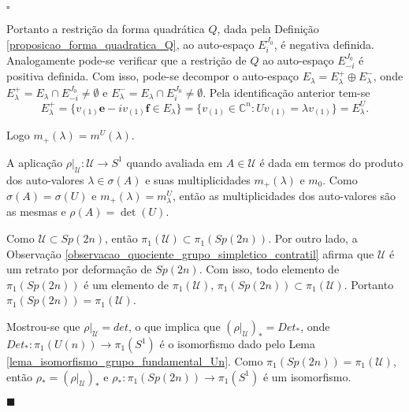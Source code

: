 \documentclass[12pt]{book}
\newenvironment{prova}[1]{$\square$ #1}{\hfill$\blacksquare$}
\newcommand{\autoespaco}[1]{E_{#1}}
\newcommand{\circulo}{S^{1}}
\newcommand{\complexo}[1]{\mathbb{C}^{#1}}
\newcommand{\espectrooperador}[1]{\sigma(#1)}
\newcommand{\estruturacomplexa}{J_{0}}
\newcommand{\grupofundamental}[1]{\pi_{1}(#1)}
\newcommand{\gruposimpletico}[1]{Sp(#1)}
\newcommand{\matrizSimpleticaOrtogonal}{\mathcal{U}}
\newcommand{\matrizunitaria}[1]{U(#1)}
\begin{document}
\begin{prova}
\begin{enumerate}
			Portanto a restrição da forma quadrática $Q$, dada pela Definição \ref{proposicao_forma_quadratica_Q}, ao auto-espaço $\autoespaco{ i}^{\estruturacomplexa}$, é negativa definida. Analogamente pode-se verificar que a restrição de $Q$ ao auto-espaço $\autoespaco{ -i}^{\estruturacomplexa}$ é positiva definida. Com isso, pode-se decompor o auto-espaço $\autoespaco{\lambda} = \autoespaco{\lambda}^{+} \oplus \autoespaco{\lambda}^{-}$, onde $\autoespaco{\lambda}^{+} = \autoespaco{\lambda}\cap \autoespaco{- i}^{\estruturacomplexa} \neq \emptyset$ e $\autoespaco{\lambda}^{-} = \autoespaco{\lambda}\cap \autoespaco{ i}^{\estruturacomplexa} \neq \emptyset$. Pela identificação anterior tem-se
			$$
			\autoespaco{\lambda}^{+}=\{v_{(1)}\textbf{e}-iv_{(1)}\textbf{f}\in \autoespaco{\lambda}\} = \{v_{(1)} \in \complexo{n} : Uv_{(1)}=\lambda v_{(1)} \} = \autoespaco{\lambda}^{U}.
			$$
			
			Logo $m_{+}(\lambda) = m^{U}(\lambda)$.
			
			A aplicação $\rho|_{\mathcal{U}}: \mathcal{U} \to \circulo$ quando avaliada em $A\in \mathcal{U}$ é dada em termos do produto dos auto-valores $\lambda \in \espectrooperador{A}$ e suas multiplicidades $m_{+}(\lambda)$ e $m_{0}$. Como $\espectrooperador{A} = \espectrooperador{U}$ e $m_{+}(\lambda)  = m_{\lambda}^{U}$, então as multiplicidades dos auto-valores são as mesmas e $\rho(A)=\det(U)$.

			Como $\matrizSimpleticaOrtogonal \subset \gruposimpletico{2n}$, então $\grupofundamental{\matrizSimpleticaOrtogonal} \subset \grupofundamental{\gruposimpletico{2n}}$. Por outro lado, a Observação \ref{observacao_quociente_grupo_simpletico_contratil} afirma que $\matrizSimpleticaOrtogonal$ é um retrato por deformação de $\gruposimpletico{2n}$. Com isso, todo elemento de $\grupofundamental{\gruposimpletico{2n}} $ é um elemento de $\grupofundamental{\matrizSimpleticaOrtogonal}$, $\grupofundamental{\gruposimpletico{2n}}\subset\grupofundamental{\matrizSimpleticaOrtogonal}$. Portanto $\grupofundamental{\gruposimpletico{2n}}=\grupofundamental{\matrizSimpleticaOrtogonal}$.
			
			Mostrou-se que $\rho|_{\matrizSimpleticaOrtogonal} =det$, o que implica que $(\rho|_{\matrizSimpleticaOrtogonal})_{*} = Det_{*}$, onde $Det_{*}:\grupofundamental{\matrizunitaria{n}} \to \grupofundamental{\circulo}$ é o isomorfismo dado pelo Lema \ref{lema_isomorfismo_grupo_fundamental_Un}. Como $\grupofundamental{\gruposimpletico{2n}}=\grupofundamental{\matrizSimpleticaOrtogonal}$, então $\rho_{*}=(\rho|_{\matrizSimpleticaOrtogonal})_{*}$ e $\rho_{*}: \grupofundamental{\gruposimpletico{2n}} \to \grupofundamental{\circulo}$ é um isomorfismo.
			

\end{enumerate}
\end{prova}
\end{document}
